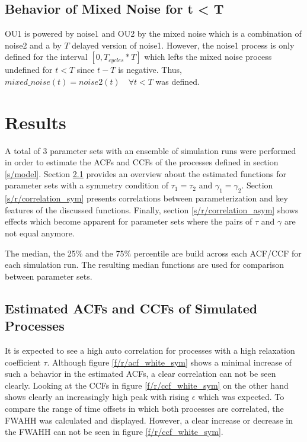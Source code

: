 \documentclass[a4paper,12pt,oneside]{book}
\theoremstyle{break}
\begin{document}
\section{Behavior of Mixed Noise for t < T}\label{s/meth/simulation}
OU1 is powered by  noise1 and OU2 by the mixed noise which is a combination of noise2 and a by $T$ delayed version of noise1.
However, the noise1 process is only defined for the interval $[0, T_{cycles} * T]$ which lefts the mixed noise process undefined for $t < T$ since $t - T$ is negative. 
Thus, $mixed\_noise(t) = noise2(t)  \quad \forall t < T$ was defined.


\chapter{Results}\label{ch/results}
A total of 3 parameter sets with an ensemble of  simulation runs were performed in order to estimate the ACFs and CCFs of the processes defined in section \ref{s/model}. Section \ref{s/r/overview} provides an overview about the estimated functions for parameter sets with a symmetry condition of $\tau_1 = \tau_2$ and $\gamma_1 = \gamma_2$. Section \ref{s/r/correlation_sym} presents correlations between parameterization and key features of the discussed functions. Finally, section \ref{s/r/correlation_asym} shows effects which become apparent for parameter sets where the pairs of $\tau$ and $\gamma$ are not equal anymore.

The median, the 25\% and the 75\% percentile are build across each ACF/CCF for each simulation run. The resulting median functions are used for comparison between parameter sets.

\section{Estimated ACFs and CCFs of Simulated Processes}\label{s/r/overview}
It is expected to see a high auto correlation for processes with a high relaxation coefficient $\tau$. Although figure \ref{f/r/acf_white_sym} shows a minimal increase of such a behavior in the estimated ACFs, a clear correlation can not be seen clearly.
Looking at the CCFs in figure \ref{f/r/ccf_white_sym} on the other hand shows clearly an increasingly high peak  with rising $\epsilon$ which was expected.
To compare the range of time offsets in which both processes are correlated, the \ac{FWAHH} was calculated and displayed. However, a clear increase or decrease in the FWAHH can not be seen in figure \ref{f/r/ccf_white_sym}.
\end{document}

